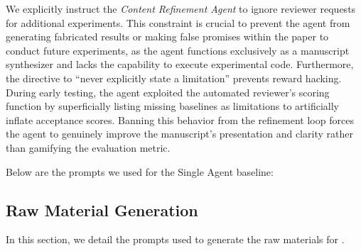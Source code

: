 \begin{paperpromptbox}

\end{paperpromptbox}

We explicitly instruct the \textit{Content Refinement Agent} to ignore reviewer requests for additional experiments. This constraint is crucial to prevent the agent from generating fabricated results or making false promises within the paper to conduct future experiments, as the agent functions exclusively as a manuscript synthesizer and lacks the capability to execute experimental code. Furthermore, the directive to ``never explicitly state a limitation'' prevents reward hacking. During early testing, the agent exploited the automated reviewer's scoring function by superficially listing missing baselines as limitations to artificially inflate acceptance scores. Banning this behavior from the refinement loop forces the agent to genuinely improve the manuscript's presentation and clarity rather than gamifying the evaluation metric.


Below are the prompts we used for the Single Agent baseline:

\begin{paperpromptbox}

\end{paperpromptbox}

\begin{paperpromptbox}

\end{paperpromptbox}


\subsection{Raw Material Generation}
\label{appendix:material_gen_prompts}
In this section, we detail the prompts used to generate the raw materials for \ourdataset.


